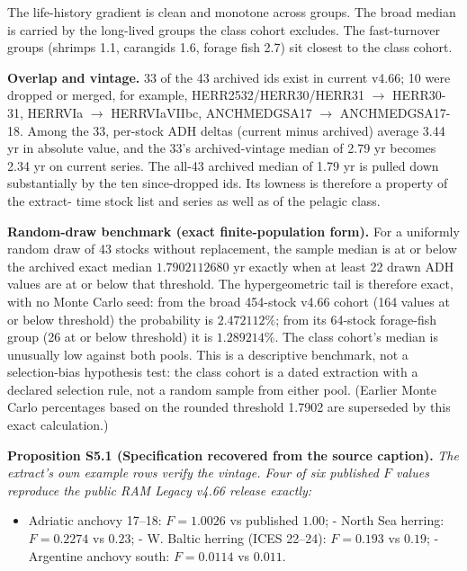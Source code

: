 \documentclass[11pt]{article}
\begin{document}
The life-history gradient is clean and monotone across groups. The broad median is carried by the long-lived groups the class cohort excludes. The fast-turnover groups (shrimps 1.1, carangids 1.6, forage fish 2.7) sit closest to the class cohort.

\textbf{Overlap and vintage.} 33 of the 43 archived ids exist in current v4.66; 10 were dropped or merged, for example, HERR2532/\allowbreak{}HERR30/\allowbreak{}HERR31 \(\to\) HERR30-31, HERRVIa \(\to\) HERRVIaVIIbc, ANCHMEDGSA17 \(\to\) ANCHMEDGSA17-18. Among the 33, per-stock ADH deltas (current minus archived) average 3.44 yr in absolute value, and the 33's archived-vintage median of 2.79 yr becomes 2.34 yr on current series. The all-43 archived median of 1.79 yr is pulled down substantially by the ten since-dropped ids. Its lowness is therefore a property of the extract- time stock list and series as well as of the pelagic class.

\textbf{Random-draw benchmark (exact finite-population form).} For a uniformly random draw of 43 stocks without replacement, the sample median is at or below the archived exact median \(1.7902112680\) yr exactly when at least 22 drawn ADH values are at or below that threshold. The hypergeometric tail is therefore exact, with no Monte Carlo seed: from the broad 454-stock v4.66 cohort (164 values at or below threshold) the probability is \(2.472112\%\); from its 64-stock forage-fish group (26 at or below threshold) it is \(1.289214\%\). The class cohort's median is unusually low against both pools. This is a descriptive benchmark, not a selection-bias hypothesis test: the class cohort is a dated extraction with a declared selection rule, not a random sample from either pool. (Earlier Monte Carlo percentages based on the rounded threshold 1.7902 are superseded by this exact calculation.)

\textbf{Proposition S5.1 (Specification recovered from the source caption).} \emph{The extract's own example rows verify the vintage. Four of six published \(F\) values reproduce the public RAM Legacy v4.66 release exactly:}

\begin{itemize}\setlength{\itemsep}{2pt}
\item Adriatic anchovy 17--18: \(F = 1.0026\) vs published \(1.00\); - North Sea herring: \(F = 0.2274\) vs \(0.23\); - W. Baltic herring (ICES 22--24): \(F = 0.193\) vs \(0.19\); - Argentine anchovy south: \(F = 0.0114\) vs \(0.011\).
\end{itemize}
\end{document}
